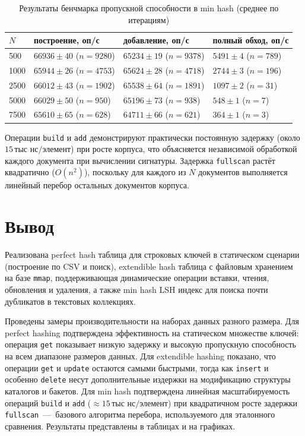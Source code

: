 \documentclass{itmo}
\begin{document}
\begin{table}[H]
	\centering
	\caption{Результаты бенчмарка пропускной способности в min hash (среднее по итерациям)}
	\label{tab:min-throughput}
	\begin{tabularx}{\textwidth}{|l|X|X|X|}
		\toprule
		$N$ & построение, оп/с & добавление, оп/с & полный обход, оп/с \\
		\midrule
		500 & $66936 \pm 40$ ($n=9280$) & $65234 \pm 19$ ($n=9378$) & $5491 \pm 4$ ($n=789$) \\
		1000 & $65944 \pm 26$ ($n=4753$) & $65624 \pm 28$ ($n=4718$) & $2744 \pm 3$ ($n=196$) \\
		2500 & $66012 \pm 43$ ($n=1902$) & $65538 \pm 64$ ($n=1891$) & $1097 \pm 2$ ($n=31$) \\
		5000 & $66029 \pm 50$ ($n=950$) & $65196 \pm 73$ ($n=938$) & $548 \pm 1$ ($n=7$) \\
		7500 & $65610 \pm 65$ ($n=628$) & $64711 \pm 66$ ($n=621$) & $364 \pm 1$ ($n=3$) \\
		\bottomrule
	\end{tabularx}
\end{table}

Операции \texttt{build} и \texttt{add} демонстрируют практически постоянную задержку (около $15\,\text{тыс нс/элемент}$) при росте корпуса, что объясняется независимой обработкой каждого документа при вычислении сигнатуры.
Задержка \texttt{fullscan} растёт квадратично ($O(n^2)$), поскольку для каждого из $N$ документов выполняется линейный перебор остальных документов корпуса.

\chapter{Вывод}

Реализована perfect hash таблица для строковых ключей в статическом сценарии (построение по CSV и поиск), extendible hash таблица с файловым хранением на базе \texttt{mmap}, поддерживающая динамические операции вставки, чтения, обновления и удаления, а также min hash LSH индекс для поиска почти дубликатов в текстовых коллекциях.

Проведены замеры производительности на наборах данных разного размера.
Для perfect hashing подтверждена эффективность на статическом множестве ключей: операция \texttt{get} показывает низкую задержку и высокую пропускную способность на всем диапазоне размеров данных.
Для extendible hashing показано, что операции \texttt{get} и \texttt{update} остаются самыми быстрыми, тогда как \texttt{insert} и особенно \texttt{delete} несут дополнительные издержки на модификацию структуры каталогов и бакетов.
Для min hash подтверждена линейная масштабируемость операций \texttt{build} и \texttt{add} ($\approx 15\,\text{тыс нс/элемент}$) при квадратичном росте задержки \texttt{fullscan}~---~базового алгоритма перебора, используемого для эталонного сравнения.
Результаты представлены в таблицах и на графиках.
\end{document}
